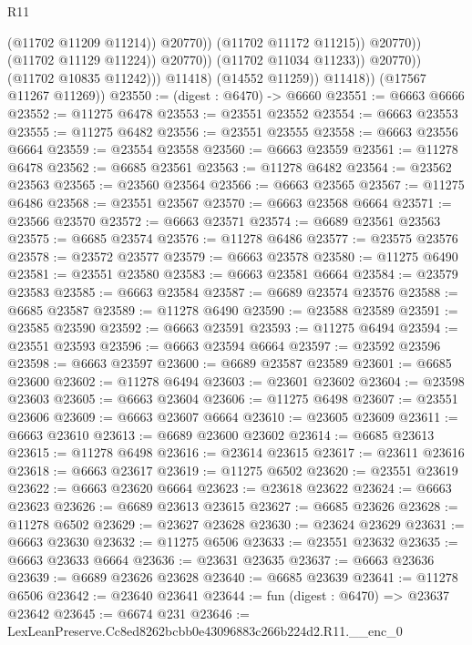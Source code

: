 \begin{lexlean}{R11}
\begin{coremodule}
                                          (@11702 @11209 @11214))
                                        @20770))
                                    (@11702 @11172 @11215))
                                  @20770))
                              (@11702 @11129 @11224))
                            @20770))
                        (@11702 @11034 @11233))
                      @20770))
                  (@11702 @10835 @11242)))
              @11418)
            (@14552 @11259))
          @11418))
      (@17567 @11267 @11269))
@23550 := (digest : @6470) -> @6660
@23551 := @6663 @6666
@23552 := @11275 @6478
@23553 := @23551 @23552
@23554 := @6663 @23553
@23555 := @11275 @6482
@23556 := @23551 @23555
@23558 := @6663 @23556 @6664
@23559 := @23554 @23558
@23560 := @6663 @23559
@23561 := @11278 @6478
@23562 := @6685 @23561
@23563 := @11278 @6482
@23564 := @23562 @23563
@23565 := @23560 @23564
@23566 := @6663 @23565
@23567 := @11275 @6486
@23568 := @23551 @23567
@23570 := @6663 @23568 @6664
@23571 := @23566 @23570
@23572 := @6663 @23571
@23574 := @6689 @23561 @23563
@23575 := @6685 @23574
@23576 := @11278 @6486
@23577 := @23575 @23576
@23578 := @23572 @23577
@23579 := @6663 @23578
@23580 := @11275 @6490
@23581 := @23551 @23580
@23583 := @6663 @23581 @6664
@23584 := @23579 @23583
@23585 := @6663 @23584
@23587 := @6689 @23574 @23576
@23588 := @6685 @23587
@23589 := @11278 @6490
@23590 := @23588 @23589
@23591 := @23585 @23590
@23592 := @6663 @23591
@23593 := @11275 @6494
@23594 := @23551 @23593
@23596 := @6663 @23594 @6664
@23597 := @23592 @23596
@23598 := @6663 @23597
@23600 := @6689 @23587 @23589
@23601 := @6685 @23600
@23602 := @11278 @6494
@23603 := @23601 @23602
@23604 := @23598 @23603
@23605 := @6663 @23604
@23606 := @11275 @6498
@23607 := @23551 @23606
@23609 := @6663 @23607 @6664
@23610 := @23605 @23609
@23611 := @6663 @23610
@23613 := @6689 @23600 @23602
@23614 := @6685 @23613
@23615 := @11278 @6498
@23616 := @23614 @23615
@23617 := @23611 @23616
@23618 := @6663 @23617
@23619 := @11275 @6502
@23620 := @23551 @23619
@23622 := @6663 @23620 @6664
@23623 := @23618 @23622
@23624 := @6663 @23623
@23626 := @6689 @23613 @23615
@23627 := @6685 @23626
@23628 := @11278 @6502
@23629 := @23627 @23628
@23630 := @23624 @23629
@23631 := @6663 @23630
@23632 := @11275 @6506
@23633 := @23551 @23632
@23635 := @6663 @23633 @6664
@23636 := @23631 @23635
@23637 := @6663 @23636
@23639 := @6689 @23626 @23628
@23640 := @6685 @23639
@23641 := @11278 @6506
@23642 := @23640 @23641
@23644 := fun (digest : @6470) => @23637 @23642
@23645 := @6674 @231
@23646 := LexLeanPreserve.Cc8ed8262bcbb0e43096883c266b224d2.R11.__enc_0

\end{coremodule}
\end{lexlean}
